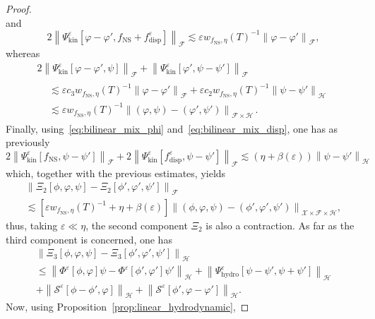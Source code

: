 \documentclass[10pt]{amsart}
\theoremstyle{definition}\newtheorem{defi}[theo]{Definition}\newtheorem{rema}[theo]{Remark}\newtheorem{exam}[theo]{Example}\newtheorem{exem}[theo]{Example}\newtheorem{nota}[theo]{Notation}
\newcommand{\ns}{\mathrm{NS}}
\newcommand{\hyd}{\mathrm{hydro}}
\newcommand{\kin}{\mathrm{kin}}
\newcommand{\disp}{\mathrm{disp}}
\renewcommand{\SS}{\mathcal{S}}
\newcommand{\FFF}{\mathscr{F}}
\newcommand{\HHH}{\mathscr{H}}
\newcommand{\GGG}{\mathscr{X}}
\newcommand{\SSSs}{\HHH}
\newcommand{\SSSl}{\GGG}
\newcommand{\SSSm}{\FFF}
\renewcommand*\le{\leqslant}
\newcommand*\eps{{\varepsilon}}
\begin{document}
\begin{proof}
\[\]
and
\[
2 \left\| \Psi^\eps_\kin [\varphi - \varphi', f_\ns + f^\eps_\disp] \right\|_{ \SSSm } \lesssim \eps w_{f_\ns, \eta}(T)^{-1} \left\| \varphi - \varphi' \right\|_{ \SSSm },
\]
whereas
\begin{multline*}
2 \left\| \Psi^\eps_\kin \left[\varphi -  \varphi', \psi\right] \right\|_{ \SSSm } + \left\| \Psi^\eps_\kin \left[\varphi', \psi - \psi'\right] \right\|_{ \SSSm } \\
\begin{aligned}
& \lesssim \eps c_3 w_{f_\ns, \eta}(T)^{-1} \left\| \varphi - \varphi' \right\|_{ \SSSm } + \eps c_2 w_{f_\ns, \eta}(T)^{-1} \left\| \psi - \psi' \right\|_{ \SSSs } \\
& \lesssim \eps w_{f_\ns, \eta}(T)^{-1}\left\| (\varphi, \psi) - (\varphi', \psi') \right\|_{ \SSSm \times \SSSs }\,.
\end{aligned}
\end{multline*}
Finally, using~\eqref{eq:bilinear_mix_phi} and~\eqref{eq:bilinear_mix_disp}, one has as previously
\[
2 \left\| \Psi^\eps_\kin \left[f_\ns, \psi - \psi'\right] \right\|_{ \SSSm } + 2 \left\| \Psi^\eps_\kin\left[f^\eps_\disp, \psi - \psi'\right] \right\|_{ \SSSm } \lesssim \left(\eta + \beta(\eps)\right) \left\| \psi - \psi' \right\|_{ \SSSs }\,
\]
which, together with the previous estimates, yields
\begin{multline*}
\left\| \Xi_2\left[\phi,  \varphi, \psi\right] - \Xi_2\left[\phi', \varphi', \psi'\right] \right\|_{ \SSSm } \\
 \lesssim \left[\eps w_{ f_\ns, \eta }(T)^{-1} +\eta + \beta(\eps)\right]\left\| (\phi, \varphi, \psi) - (\phi', \varphi', \psi') \right\|_{ \SSSl \times \SSSm \times \SSSs },
\end{multline*}
thus, taking $\eps \ll \eta$, the second component $\Xi_2$ is also a contraction. As far as the third component is concerned, one has
\begin{multline*}
\left\| \Xi_3\left[\phi, \varphi, \psi\right]  - \Xi_3\left[\phi', \varphi', \psi'\right] \right\|_{ \SSSs } \\
 \le \left\| \Phi^\eps\left[\phi, \varphi\right] \psi - \Phi^\eps\left[\phi', \varphi'\right] \psi' \right\|_{ \SSSs } + \left\| \Psi^\eps_\hyd\left[\psi - \psi', \psi + \psi'\right] \right\|_{ \SSSs }\\
+ \left\| \SS^\eps\left[\phi-\phi',\varphi\right]\right\|_{\SSSs} + \left\| \SS^\eps\left[\phi',\varphi-\varphi'\right]\right\|_{\SSSs}.
\end{multline*}
Now, using Proposition~\ref{prop:linear_hydrodynamic},

\end{proof}
\end{document}
